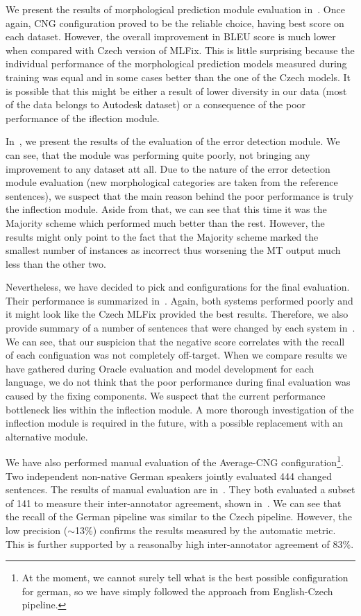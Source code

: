 We present the results of morphological prediction module evaluation in~.
Once again, CNG configuration proved to be the reliable choice, having best score on each dataset.
However, the overall improvement in BLEU score is much lower when compared with Czech version
of MLFix. This is little surprising because the individual performance of the morphological prediction
models measured during training was equal and in some cases better than the one of the Czech models.
It is possible that this might be either a result of lower diversity in our data (most of the data belongs
to Autodesk dataset) or a consequence of the poor performance of the iflection module.

In~, we present the results of the evaluation of the error detection module.
We can see, that the module was performing quite poorly, not bringing any improvement to any dataset att all. Due to the nature of the error detection module evaluation (new morphological categories are taken from the reference sentences), we suspect that the main reason behind the poor performance is truly the
inflection module. Aside from that, we can see that this time it was the Majority scheme which performed
 much better than the rest. However, the results might only point to the fact that the Majority scheme
 marked the smallest number of instances as incorrect thus worsening the MT output much less than the
 other two.

Nevertheless, we have decided to pick  and  configurations
for the final evaluation. Their performance is summarized in~. Again, both
systems performed poorly and it might look like the Czech MLFix provided the best results. Therefore,
we also provide summary of a number of sentences that were changed by each system in~.
We can see, that our suspicion that the negative score correlates with the recall of each configuation was not
completely off-target. When we compare results we have gathered during Oracle evaluation and model
development for each language, we do not think that the poor performance during final evaluation was caused by the fixing
components. We suspect that the current performance bottleneck lies within the inflection module.
A more thorough investigation of the inflection module is required in the future, with a possible
replacement with an alternative module.

We have also performed manual evaluation of the Average-CNG configuration\footnote{At the moment, we cannot surely tell what is
the best possible configuration for german, so we have simply followed the approach from English-Czech pipeline.}. Two
independent non-native German speakers jointly evaluated 444 changed sentences. The results of manual evaluation are in~.
They both evaluated a subset of 141 to measure their inter-annotator agreement, shown in~.
We can see that the recall of the German pipeline was similar to the Czech pipeline. However, the low precision ($\sim$13\%)
confirms the results measured by the automatic metric. This is further supported by a reasonalby high inter-annotator agreement of 83\%.

